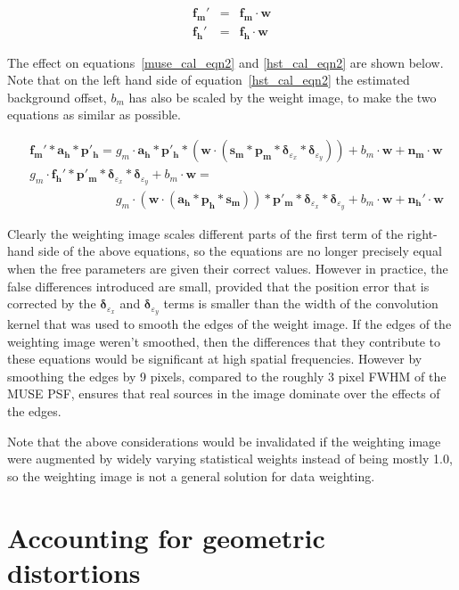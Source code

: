 \documentclass[12pt,twoside,a4paper]{article}
\newcommand{\msky}{\mathbf{s_m}}
\newcommand{\mpsf}{\mathbf{p_m}}
\newcommand{\hpsf}{\mathbf{p_h}}
\newcommand{\mepsf}{\mathbf{p'_m}}
\newcommand{\hepsf}{\mathbf{p'_h}}
\newcommand{\hlpf}{\mathbf{a_h}}
\newcommand{\mimg}{\mathbf{f_m}}
\newcommand{\himg}{\mathbf{f_h}}
\newcommand{\mnoise}{\mathbf{n_m}}
\newcommand{\hnoise}{\mathbf{n_h}}
\newcommand{\mdx}{\bm{\delta}_{\dx}}
\newcommand{\mdy}{\bm{\delta}_{\dy}}
\newcommand{\dx}{\varepsilon_x}
\newcommand{\dy}{\varepsilon_y}
\newcommand{\wt}{\bm{w}}
\newcommand{\mgain}{g_m}
\newcommand{\mbg}{b_m}
\begin{document}
\begin{eqnarray}
  \mimg' &=& \mimg \cdot \wt \\
  \himg' &=& \himg \cdot \wt
\end{eqnarray}

The effect on equations~\ref{muse_cal_eqn2} and \ref{hst_cal_eqn2} are
shown below. Note that on the left hand side of
equation~\ref{hst_cal_eqn2} the estimated background offset, $\mbg$
has also be scaled by the weight image, to make the two equations as
similar as possible.

\begin{align}
\label{muse_cal_eqn3}
&\mimg' \ast \hlpf \ast \hepsf = \mgain \cdot \hlpf \ast \hepsf \ast (\wt\cdot(\msky \ast \mpsf \ast \mdx \ast \mdy)) + \mbg\cdot\wt+\mnoise\cdot\wt\\
\label{hst_cal_eqn3}
&\mgain \cdot \himg' \ast \mepsf \ast \mdx
\ast \mdy + \mbg\cdot\wt = \nonumber \\
& \phantom{\mimg' \ast \hlpf \ast \hepsf ={}} \mgain\cdot(\wt\cdot(\hlpf \ast \hpsf \ast \msky)) \ast \mepsf \ast \mdx \ast \mdy + \mbg\cdot\wt + \hnoise'\cdot\wt
\end{align}

Clearly the weighting image scales different parts of the first term
of the right-hand side of the above equations, so the equations are no
longer precisely equal when the free parameters are given their
correct values. However in practice, the false differences introduced
are small, provided that the position error that is corrected by the
$\mdx$ and $\mdy$ terms is smaller than the width of the convolution
kernel that was used to smooth the edges of the weight image. If the
edges of the weighting image weren't smoothed, then the differences
that they contribute to these equations would be significant at high
spatial frequencies. However by smoothing the edges by 9 pixels,
compared to the roughly 3 pixel FWHM of the MUSE PSF, ensures that
real sources in the image dominate over the effects of the edges.

Note that the above considerations would be invalidated if the
weighting image were augmented by widely varying statistical weights
instead of being mostly 1.0, so the weighting image is not a general
solution for data weighting.

\section{Accounting for geometric distortions}
\end{document}
